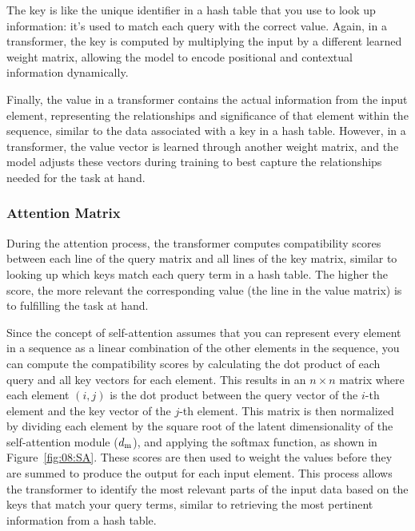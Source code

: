 The key is like the unique identifier in a hash table that you use to look up information: it's used to match each query with the correct value. Again, in a transformer, the key is computed by multiplying the input by a different learned weight matrix, allowing the model to encode positional and contextual information dynamically.

Finally, the value in a transformer contains the actual information from the input element, representing the relationships and significance of that element within the sequence, similar to the data associated with a key in a hash table.  However, in a transformer, the value vector is learned through another weight matrix, and the model adjusts these vectors during training to best capture the relationships needed for the task at hand.

\subsubsection{Attention Matrix}

During the attention process, the transformer computes compatibility scores between each line of the query matrix and all lines of the key matrix, similar to looking up which keys match each query term in a hash table. The higher the score, the more relevant the corresponding value (the line in the value matrix) is to fulfilling the task at hand. 

Since the concept of self-attention assumes that you can represent every element in a sequence as a linear combination of the other elements in the sequence, you can compute the compatibility scores by calculating the dot product of each query and all key vectors for each element. 
This results in an $n \times n$ matrix where each element $(i, j)$ is the dot product between the query vector of the $i$-th element and the key vector of the $j$-th element. This matrix is then normalized by dividing each element by the square root of the latent dimensionality of the self-attention module ($d_{\rm m}$), and applying the softmax function, as shown in Figure~\ref{fig:08:SA}. 
These scores are then used to weight the values before they are summed to produce the output for each input element. This process allows the transformer to identify the most relevant parts of the input data based on the keys that match your query terms, similar to retrieving the most pertinent information from a hash table.



